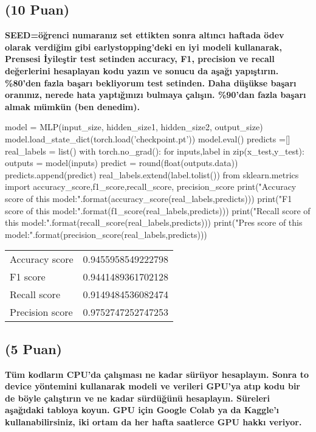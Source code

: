 \documentclass[11pt]{article}
\begin{document}
\subsection{(10 Puan)} \textbf{SEED=öğrenci numaranız set ettikten sonra altıncı haftada ödev olarak verdiğim gibi earlystopping'deki en iyi modeli kullanarak, Prensesi İyileştir test setinden accuracy, F1, precision ve recall değerlerini hesaplayan kodu yazın ve sonucu da aşağı yapıştırın. \%80'den fazla başarı bekliyorum test setinden. Daha düşükse başarı oranınız, nerede hata yaptığınızı bulmaya çalışın. \%90'dan fazla başarı almak mümkün (ben denedim).}

\begin{python}
model = MLP(input_size, hidden_size1, hidden_size2, output_size)
model.load_state_dict(torch.load('checkpoint.pt'))
model.eval()
predicts =[]
real_labels = list()
with torch.no_grad():
    for inputs,label in zip(x_test,y_test):
        outputs = model(inputs)
        predict = round(float(outputs.data))
        predicts.append(predict)
        real_labels.extend(label.tolist())
from sklearn.metrics import accuracy_score,f1_score,recall_score, precision_score
print("Accuracy score of this model:{}".format(accuracy_score(real_labels,predicts)))
print("F1 score of this model:{}".format(f1_score(real_labels,predicts)))
print("Recall score of this model:{}".format(recall_score(real_labels,predicts)))
print("Pres score of this model:{}".format(precision_score(real_labels,predicts)))
\end{python}

\begin{table}[h]
\centering
\begin{tabular}{|l|c|}
\hline
Accuracy score & 0.9455958549222798 \\
F1 score & 0.9441489361702128 \\
Recall score & 0.9149484536082474 \\
Precision score & 0.9752747252747253 \\
\end{tabular}
\end{table}

\subsection{(5 Puan)} \textbf{Tüm kodların CPU'da çalışması ne kadar sürüyor hesaplayın. Sonra to device yöntemini kullanarak modeli ve verileri GPU'ya atıp kodu bir de böyle çalıştırın ve ne kadar sürdüğünü hesaplayın. Süreleri aşağıdaki tabloya koyun. GPU için Google Colab ya da Kaggle'ı kullanabilirsiniz, iki ortam da her hafta saatlerce GPU hakkı veriyor.}
\end{document}
